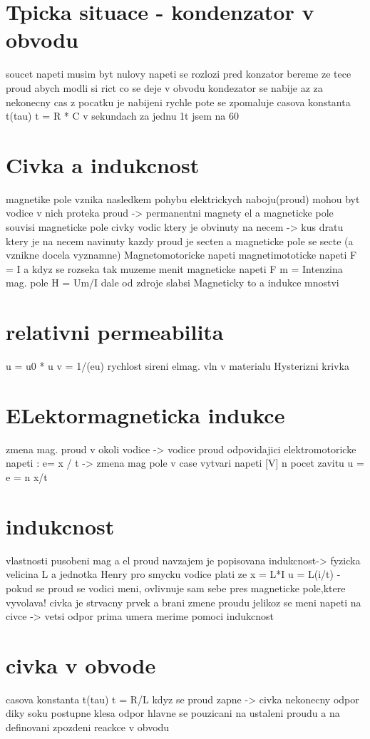 \documentclass{article}
\begin{document}
\section{Tpicka situace - kondenzator v obvodu}
soucet napeti musim byt nulovy
napeti se rozlozi
pred konzator bereme ze tece proud abych modli si rict co se deje v obvodu
kondezator se nabije az za nekonecny cas
z pocatku je nabijeni rychle pote se zpomaluje
casova konstanta t(tau)
t = R * C v sekundach
za jednu 1t jsem na 60%
\section{Civka a indukcnost}
magnetike pole
    vznika nasledkem pohybu elektrickych naboju(proud)
    mohou byt vodice v nich proteka proud -> permanentni magnety
    el a magneticke pole souvisi
magneticke pole civky
vodic ktery je obvinuty na necem -> kus dratu ktery je na necem navinuty
kazdy proud je secten a magneticke pole se secte (a vznikne  docela vyznamne)
Magnetomotoricke napeti
    magnetimototicke napeti F = I
    a kdyz se rozseka tak muzeme menit magneticke napeti
    F m = \sum
Intenzina mag. pole
    H = Um/I
    dale od zdroje slabsi
Magneticky to a indukce
    mnostvi
\section{relativni permeabilita}
u = u0 * u
v = 1/\sqrt(eu) rychlost sireni elmag. vln v materialu
Hysterizni krivka
\section{ELektormagneticka indukce}
zmena mag. proud v okoli vodice -> vodice proud
odpovidajici elektromotoricke napeti :
    e= x / t -> zmena mag pole v case vytvari napeti [V]
    n pocet zavitu
    u = e = n x/t
\section{indukcnost}
vlastnosti pusobeni mag a el proud navzajem je popisovana indukcnost-> fyzicka velicina
L a jednotka Henry
pro smycku vodice plati ze x = L*I
u = L(i/t)
- pokud se proud se vodici meni, ovlivnuje sam sebe pres magneticke pole,ktere vyvolava!
civka je strvacny prvek a brani zmene proudu jelikoz se meni napeti na civce -> vetsi odpor prima umera
merime pomoci indukcnost
\section{civka v obvode}
casova konstanta t(tau)
t = R/L
kdyz se proud zapne -> civka nekonecny odpor diky soku postupne klesa odpor
hlavne se pouzicani na ustaleni proudu
a na definovani zpozdeni reackce v obvodu
\end{document}
